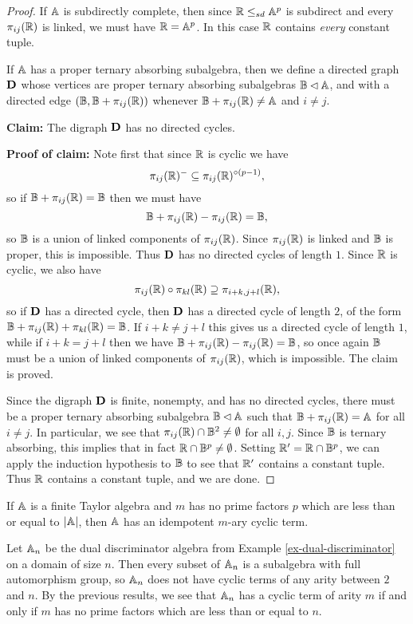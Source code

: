 \documentclass[letterpaper,11pt]{article}
\begin{document}
\begin{proof}
If $\mathbb{A}$ is subdirectly complete, then since $\mathbb{R} \le_{sd} \mathbb{A}^p$ is subdirect and every $\pi_{ij}(\mathbb{R})$ is linked, we must have $\mathbb{R} = \mathbb{A}^p$. In this case $\mathbb{R}$ contains \emph{every} constant tuple.

If $\mathbb{A}$ has a proper ternary absorbing subalgebra, then we define a directed graph $\mathbf{D}$ whose vertices are proper ternary absorbing subalgebras $\mathbb{B} \lhd \mathbb{A}$, and with a directed edge $(\mathbb{B}, \mathbb{B}+\pi_{ij}(\mathbb{R}))$ whenever $\mathbb{B} + \pi_{ij}(\mathbb{R}) \ne \mathbb{A}$ and $i \ne j$.

{\bf Claim:} The digraph $\mathbf{D}$ has no directed cycles.

{\bf Proof of claim:} Note first that since $\mathbb{R}$ is cyclic we have
\[
\pi_{ij}(\mathbb{R})^- \subseteq \pi_{ij}(\mathbb{R})^{\circ (p-1)},
\]
so if $\mathbb{B} + \pi_{ij}(\mathbb{R}) = \mathbb{B}$ then we must have
\[
\mathbb{B} + \pi_{ij}(\mathbb{R}) - \pi_{ij}(\mathbb{R}) = \mathbb{B},
\]
so $\mathbb{B}$ is a union of linked components of $\pi_{ij}(\mathbb{R})$. Since $\pi_{ij}(\mathbb{R})$ is linked and $\mathbb{B}$ is proper, this is impossible. Thus $\mathbf{D}$ has no directed cycles of length $1$. Since $\mathbb{R}$ is cyclic, we also have
\[
\pi_{ij}(\mathbb{R})\circ \pi_{kl}(\mathbb{R}) \supseteq \pi_{i+k,j+l}(\mathbb{R}),
\]
so if $\mathbf{D}$ has a directed cycle, then $\mathbf{D}$ has a directed cycle of length $2$, of the form $\mathbb{B} + \pi_{ij}(\mathbb{R}) + \pi_{kl}(\mathbb{R}) = \mathbb{B}$. If $i+k \ne j+l$ this gives us a directed cycle of length $1$, while if $i+k = j+l$ then we have $\mathbb{B} + \pi_{ij}(\mathbb{R}) - \pi_{ij}(\mathbb{R}) = \mathbb{B}$, so once again $\mathbb{B}$ must be a union of linked components of $\pi_{ij}(\mathbb{R})$, which is impossible. The claim is proved.

Since the digraph $\mathbf{D}$ is finite, nonempty, and has no directed cycles, there must be a proper ternary absorbing subalgebra $\mathbb{B} \lhd \mathbb{A}$ such that $\mathbb{B} + \pi_{ij}(\mathbb{R}) = \mathbb{A}$ for all $i \ne j$. In particular, we see that $\pi_{ij}(\mathbb{R}) \cap \mathbb{B}^2 \ne \emptyset$ for all $i,j$. Since $\mathbb{B}$ is ternary absorbing, this implies that in fact $\mathbb{R} \cap \mathbb{B}^p \ne \emptyset$. Setting $\mathbb{R}' = \mathbb{R} \cap \mathbb{B}^p$, we can apply the induction hypothesis to $\mathbb{B}$ to see that $\mathbb{R}'$ contains a constant tuple. Thus $\mathbb{R}$ contains a constant tuple, and we are done.
\end{proof}

\begin{cor} If $\mathbb{A}$ is a finite Taylor algebra and $m$ has no prime factors $p$ which are less than or equal to $|\mathbb{A}|$, then $\mathbb{A}$ has an idempotent $m$-ary cyclic term.
\end{cor}

\begin{ex} Let $\mathbb{A}_n$ be the dual discriminator algebra from Example \ref{ex-dual-discriminator} on a domain of size $n$. Then every subset of $\mathbb{A}_n$ is a subalgebra with full automorphism group, so $\mathbb{A}_n$ does not have cyclic terms of any arity between $2$ and $n$. By the previous results, we see that $\mathbb{A}_n$ has a cyclic term of arity $m$ if and only if $m$ has no prime factors which are less than or equal to $n$.
\end{ex}
\end{document}
